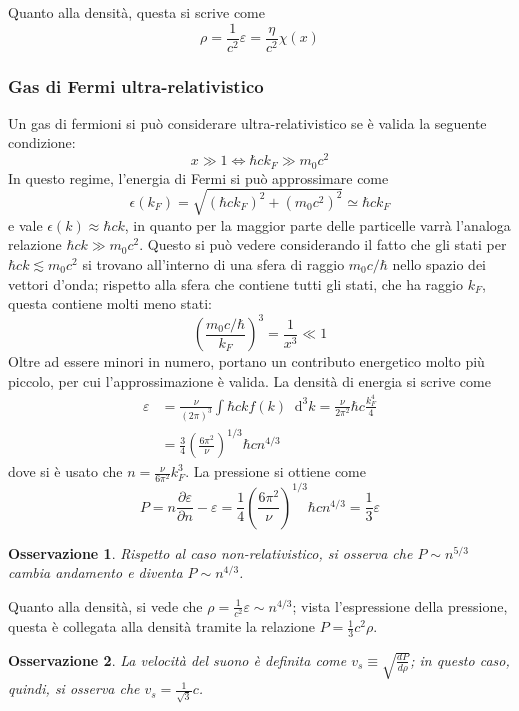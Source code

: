 \documentclass[11pt, a4paper]{scrartcl}
\theoremstyle{style}
\newtheorem{osservazione}{Osservazione}[section]
\newcommand{\dd}{\mathop{}\!\mathrm{d}}
\numberwithin{equation}{subsection}
\begin{document}
\noindent Quanto alla densit\`a, questa si scrive come
\[
\rho  = \frac{1}{c^2} \varepsilon = \frac{\eta }{c^2} \chi (x)
\] 

\subsubsection{Gas di Fermi ultra-relativistico}

Un gas di fermioni si pu\`o considerare ultra-relativistico se \`e valida la seguente condizione:
\begin{equation}
	x \gg 1 \iff \hbar c k_F  \gg m_0 c^2
\end{equation}
In questo regime, l'energia di Fermi si pu\`o approssimare come 
\[
\epsilon (k_F) =\sqrt{(\hbar c k_F)^2 + (m_0c^2)^2}  \simeq \hbar  c k_F
\] 
e vale $\epsilon (k) \approx \hbar c k$, in quanto per la maggior parte delle particelle varr\`a l'analoga relazione $\hbar  c k \gg m_0c^2$. 
Questo si pu\`o vedere considerando il fatto che gli stati per $\hbar c k \lesssim m_0c^2$ si trovano all'interno di una sfera di raggio $m_0 c / \hbar $ nello spazio dei vettori d'onda; rispetto alla sfera che contiene tutti gli stati, che ha raggio $k_F$, questa contiene molti meno stati:
\[
\left(\frac{m_0 c / \hbar }{k_F}\right) ^3 = \frac{1}{x^3} \ll 1
\] 
Oltre ad essere minori in numero, portano un contributo energetico molto pi\`u piccolo, per cui l'approssimazione \`e valida.
La densit\`a di energia si scrive come
\[
	\begin{split}
		\varepsilon &= \frac{\nu }{(2\pi)^3} \int \hbar  c k f(k) \dd ^3 k=  \frac{\nu }{2\pi^2} \hbar  c \frac{k_F^4}{4} \\
			    &= \frac{3}{4} \left(\frac{6\pi^2}{\nu }\right) ^{1 / 3} \hbar  c n^{ 4/3}
	\end{split}
\] 
dove si \`e usato che $n = \frac{\nu }{6\pi^2} k_F^3$.
La pressione si ottiene come
\[
		P = n \frac{\partial \varepsilon }{\partial n}  - \varepsilon  = \frac{1}{4} \left(\frac{6\pi^2}{\nu }\right) ^{1 / 3} \hbar c n^{4 / 3} = \frac{1}{3} \varepsilon 
\] 
\begin{osservazione}
Rispetto al caso non-relativistico, si osserva che $P\sim n^{5 / 3}$ cambia andamento e diventa $P \sim n^{4 / 3}$.
\end{osservazione}

\noindent Quanto alla densit\`a, si vede che $\rho  = \frac{1}{c^2} \varepsilon \sim n^{4 / 3}$; vista l'espressione della pressione, questa \`e collegata alla densit\`a tramite la relazione $P = \frac{1}{3} c^2 \rho $.
\begin{osservazione}
La velocit\`a del suono \`e definita come $v_s \equiv \sqrt{\frac{d P}{d \rho } } $; in questo caso, quindi, si osserva che  $v_s = \frac{1}{\sqrt{3} } c$.

\end{osservazione}
\end{document}
